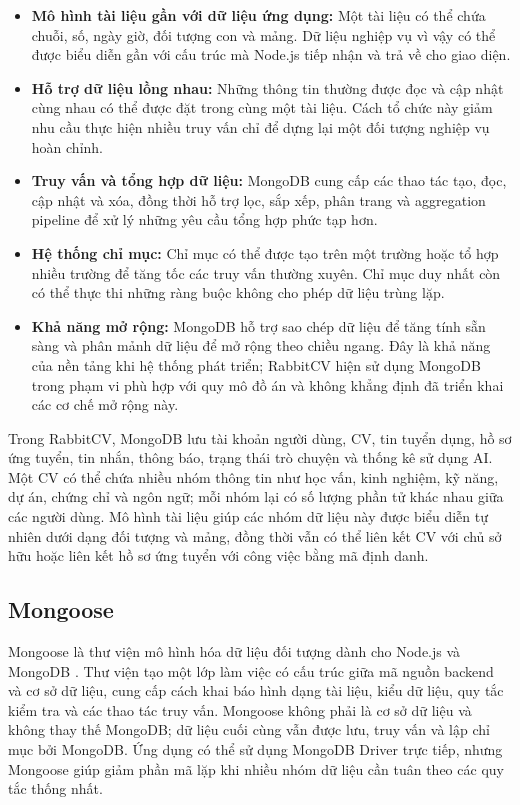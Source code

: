 \begin{itemize}
    \item \textbf{Mô hình tài liệu gần với dữ liệu ứng dụng:} Một tài liệu có thể chứa chuỗi, số, ngày giờ, đối tượng con và mảng. Dữ liệu nghiệp vụ vì vậy có thể được biểu diễn gần với cấu trúc mà Node.js tiếp nhận và trả về cho giao diện.

    \item \textbf{Hỗ trợ dữ liệu lồng nhau:} Những thông tin thường được đọc và cập nhật cùng nhau có thể được đặt trong cùng một tài liệu. Cách tổ chức này giảm nhu cầu thực hiện nhiều truy vấn chỉ để dựng lại một đối tượng nghiệp vụ hoàn chỉnh.

    \item \textbf{Truy vấn và tổng hợp dữ liệu:} MongoDB cung cấp các thao tác tạo, đọc, cập nhật và xóa, đồng thời hỗ trợ lọc, sắp xếp, phân trang và aggregation pipeline để xử lý những yêu cầu tổng hợp phức tạp hơn.

    \item \textbf{Hệ thống chỉ mục:} Chỉ mục có thể được tạo trên một trường hoặc tổ hợp nhiều trường để tăng tốc các truy vấn thường xuyên. Chỉ mục duy nhất còn có thể thực thi những ràng buộc không cho phép dữ liệu trùng lặp.

    \item \textbf{Khả năng mở rộng:} MongoDB hỗ trợ sao chép dữ liệu để tăng tính sẵn sàng và phân mảnh dữ liệu để mở rộng theo chiều ngang. Đây là khả năng của nền tảng khi hệ thống phát triển; RabbitCV hiện sử dụng MongoDB trong phạm vi phù hợp với quy mô đồ án và không khẳng định đã triển khai các cơ chế mở rộng này.
\end{itemize}

Trong RabbitCV, MongoDB lưu tài khoản người dùng, CV, tin tuyển dụng, hồ sơ ứng tuyển, tin nhắn, thông báo, trạng thái trò chuyện và thống kê sử dụng AI. Một CV có thể chứa nhiều nhóm thông tin như học vấn, kinh nghiệm, kỹ năng, dự án, chứng chỉ và ngôn ngữ; mỗi nhóm lại có số lượng phần tử khác nhau giữa các người dùng. Mô hình tài liệu giúp các nhóm dữ liệu này được biểu diễn tự nhiên dưới dạng đối tượng và mảng, đồng thời vẫn có thể liên kết CV với chủ sở hữu hoặc liên kết hồ sơ ứng tuyển với công việc bằng mã định danh.

\subsection{Mongoose}

Mongoose là thư viện mô hình hóa dữ liệu đối tượng dành cho Node.js và MongoDB \cite{mongooseDocs}. Thư viện tạo một lớp làm việc có cấu trúc giữa mã nguồn backend và cơ sở dữ liệu, cung cấp cách khai báo hình dạng tài liệu, kiểu dữ liệu, quy tắc kiểm tra và các thao tác truy vấn. Mongoose không phải là cơ sở dữ liệu và không thay thế MongoDB; dữ liệu cuối cùng vẫn được lưu, truy vấn và lập chỉ mục bởi MongoDB. Ứng dụng có thể sử dụng MongoDB Driver trực tiếp, nhưng Mongoose giúp giảm phần mã lặp khi nhiều nhóm dữ liệu cần tuân theo các quy tắc thống nhất.


